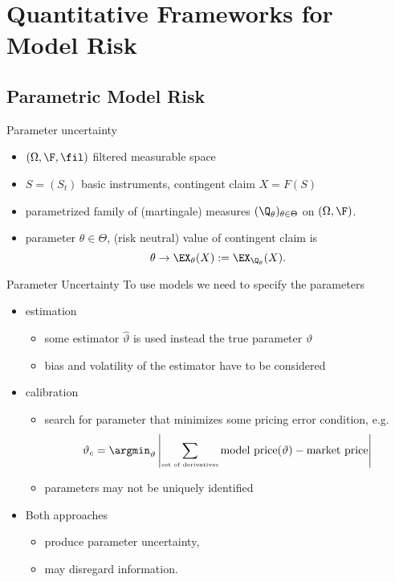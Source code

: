 \section{Quantitative Frameworks for Model Risk}
\subsection{Parametric Model Risk}

{Parameter uncertainty}
\begin{itemize}
\item $(\Omega, \F, \fil)$ filtered measurable space
\item $S= (S_t)$ basic instruments, contingent claim $X=F(S)$
\item parametrized family of (martingale) measures $(\Q_\theta)_{\theta \in \Theta}$ on $(\Omega, \F)$.
\item parameter $\theta \in \Theta$, (risk neutral) value of contingent claim is
$$
\theta \rightarrow \EX_\theta(X) := \EX_{\Q_\theta}(X).
$$

\end{itemize}

{Parameter Uncertainty}
To use models we need to specify the parameters
\begin{itemize}
\item<1-> estimation
\begin{itemize}
\item some estimator $\hat{\vartheta}$ is used instead the true parameter $\vartheta$
\item bias and volatility of the estimator have to be considered
\end{itemize}
\item<2-> calibration
\begin{itemize}
\item search for parameter that minimizes some pricing error condition, e.g.
$$
\vartheta_c = \argmin_{\vartheta} \left| \sum_{\mbox{\tiny set of derivatives}} \mbox{model price} (\vartheta) - \mbox{market price} \right|
$$
\item parameters may not be uniquely identified
\end{itemize}
\item<3-> Both approaches
\begin{itemize}
\item produce parameter uncertainty,
\item may disregard information.
\end{itemize}
\end{itemize}

